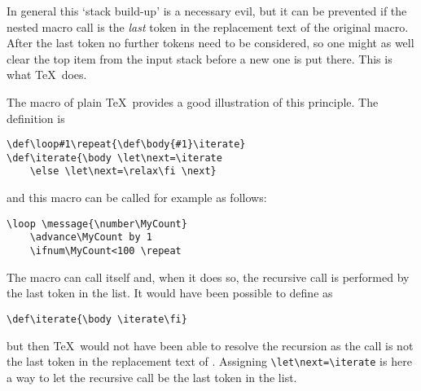 \documentclass[letterpaper]{book}
\begin{document}
In general this `stack build-up' is a necessary evil, but
it can be prevented if the nested macro call is the
{\em last\/} token in the replacement text of the original
macro. After the last token no further tokens need to be
considered, so one might as well clear the top item
from the input stack
before a new one is put there.
This is what \TeX\ does.

The  macro of plain \TeX\ provides a good illustration
\label{loop:ex}
of this principle. The definition is
\begin{verbatim}
\def\loop#1\repeat{\def\body{#1}\iterate}
\def\iterate{\body \let\next=\iterate
    \else \let\next=\relax\fi \next}
\end{verbatim}
and this macro can be called for example as follows:
\begin{verbatim}
\loop \message{\number\MyCount}
    \advance\MyCount by 1
    \ifnum\MyCount<100 \repeat
\end{verbatim}
The macro  can call itself and, when it does so,
the recursive call is performed by the last token in the list.
It would have been possible to define 
as
\begin{verbatim}
\def\iterate{\body \iterate\fi}
\end{verbatim}
but then \TeX\ would not have been able to resolve the recursion
as the call  is not the last token in the replacement
text of . Assigning \verb>\let\next=\iterate>
is here a way to let
the recursive call be the last token in the list.
\end{document}
